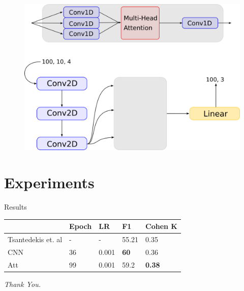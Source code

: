 \documentclass{beamer}
\begin{document}
\begin{frame}
    \begin{figure}
        \centering
        \includegraphics[scale=0.35]{imgs/attention.png}
    \end{figure}
\end{frame}

\section{Experiments}
\begin{frame}{Results}
    \begin{center}
        \begin{tabular}{ l l l l l }
                               & \textbf{Epoch} & \textbf{LR} & \textbf{F1} & \textbf{Cohen K} \\
            \hline
            Tsantedekis et. al & -              & -           & 55.21       & 0.35             \\
            CNN                & 36             & 0.001       & \textbf{60} & 0.36             \\
            Att                & 99             & 0.001       & 59.2        & \textbf{0.38}    \\
            \hline
        \end{tabular}
    \end{center}
\end{frame}

\begin{frame}
    \centering
    \huge{\textit{Thank You.}}
\end{frame}
\end{document}
